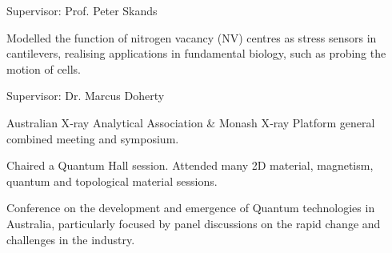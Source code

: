 \documentclass[10pt,a4paper,ragged2e,withhyper]{altacv}
\begin{document}
		\faUsers\hspace{4pt} Supervisor: Prof. Peter Skands
		
		\divider
		
		\vspace{-0.2em}
		{\textalignment Modelled the function of nitrogen vacancy (NV) centres as stress sensors in cantilevers, realising applications in fundamental biology, such as probing the motion of cells.}
		
		\vspace{1em}\faUsers\hspace{4pt} Supervisor: Dr. Marcus Doherty
		
	\divider
	
	
		Australian X‐ray Analytical Association \& Monash X‐ray Platform general combined meeting and symposium.

		\divider

		Chaired a Quantum Hall session. Attended many 2D material, magnetism, quantum and topological material sessions. 
		
		\divider
		
		Conference on the development and emergence of Quantum technologies in Australia, particularly focused by panel discussions on the rapid change and challenges in the industry.
		
		\divider
		
\end{document}
